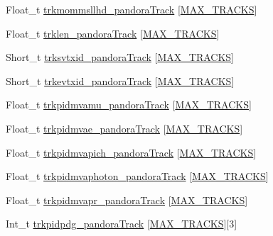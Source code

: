 \begin{DoxyCompactItemize}
\item 
Float\-\_\-t \hyperlink{classanatree_a93bd3ed25f1c1f6db57d77edf391346c}{trkmommsllhd\-\_\-pandora\-Track} \mbox{[}\hyperlink{anatree__core__v09410002_8h_a327fd4e796e4a0d78947524c96e4362e}{M\-A\-X\-\_\-\-T\-R\-A\-C\-K\-S}\mbox{]}
\item 
Float\-\_\-t \hyperlink{classanatree_acd1961cb842d4578a53ec76be72ed606}{trklen\-\_\-pandora\-Track} \mbox{[}\hyperlink{anatree__core__v09410002_8h_a327fd4e796e4a0d78947524c96e4362e}{M\-A\-X\-\_\-\-T\-R\-A\-C\-K\-S}\mbox{]}
\item 
Short\-\_\-t \hyperlink{classanatree_a54239e76d4ff42ad1881942c5984527d}{trksvtxid\-\_\-pandora\-Track} \mbox{[}\hyperlink{anatree__core__v09410002_8h_a327fd4e796e4a0d78947524c96e4362e}{M\-A\-X\-\_\-\-T\-R\-A\-C\-K\-S}\mbox{]}
\item 
Short\-\_\-t \hyperlink{classanatree_af9d547ab61ed895f06eadddf3f5b1a48}{trkevtxid\-\_\-pandora\-Track} \mbox{[}\hyperlink{anatree__core__v09410002_8h_a327fd4e796e4a0d78947524c96e4362e}{M\-A\-X\-\_\-\-T\-R\-A\-C\-K\-S}\mbox{]}
\item 
Float\-\_\-t \hyperlink{classanatree_a162fe363578d752417ce4df642ca58ba}{trkpidmvamu\-\_\-pandora\-Track} \mbox{[}\hyperlink{anatree__core__v09410002_8h_a327fd4e796e4a0d78947524c96e4362e}{M\-A\-X\-\_\-\-T\-R\-A\-C\-K\-S}\mbox{]}
\item 
Float\-\_\-t \hyperlink{classanatree_a3ec8db7dd8d43370ee8cbf7c07653968}{trkpidmvae\-\_\-pandora\-Track} \mbox{[}\hyperlink{anatree__core__v09410002_8h_a327fd4e796e4a0d78947524c96e4362e}{M\-A\-X\-\_\-\-T\-R\-A\-C\-K\-S}\mbox{]}
\item 
Float\-\_\-t \hyperlink{classanatree_a19da3d95303f59672c123ed72a8bd0e3}{trkpidmvapich\-\_\-pandora\-Track} \mbox{[}\hyperlink{anatree__core__v09410002_8h_a327fd4e796e4a0d78947524c96e4362e}{M\-A\-X\-\_\-\-T\-R\-A\-C\-K\-S}\mbox{]}
\item 
Float\-\_\-t \hyperlink{classanatree_a4b3f933f34841a84d5a611959596c0b8}{trkpidmvaphoton\-\_\-pandora\-Track} \mbox{[}\hyperlink{anatree__core__v09410002_8h_a327fd4e796e4a0d78947524c96e4362e}{M\-A\-X\-\_\-\-T\-R\-A\-C\-K\-S}\mbox{]}
\item 
Float\-\_\-t \hyperlink{classanatree_a5463178fd5350de3307da3766ca050ff}{trkpidmvapr\-\_\-pandora\-Track} \mbox{[}\hyperlink{anatree__core__v09410002_8h_a327fd4e796e4a0d78947524c96e4362e}{M\-A\-X\-\_\-\-T\-R\-A\-C\-K\-S}\mbox{]}
\item 
Int\-\_\-t \hyperlink{classanatree_a00011e8576a8d5ed7b91a831c7e08f29}{trkpidpdg\-\_\-pandora\-Track} \mbox{[}\hyperlink{anatree__core__v09410002_8h_a327fd4e796e4a0d78947524c96e4362e}{M\-A\-X\-\_\-\-T\-R\-A\-C\-K\-S}\mbox{]}\mbox{[}3\mbox{]}

\end{DoxyCompactItemize}

